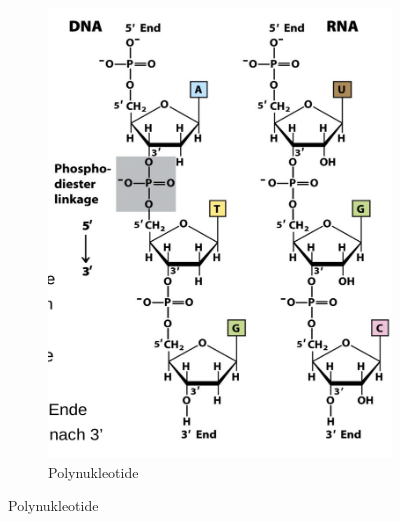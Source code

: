\documentclass[a4paper,twocolumn,usegeometry,english,fontsize=6,DIV=16]{scrartcl}
\begin{document}
\begin{figure}
\begin{subfigure}{.5\linewidth}
		\includegraphics[width=\linewidth]{img/polynukleotide.png}
		\caption{Polynukleotide}
	\end{subfigure}%
\end{figure}
\end{document}
